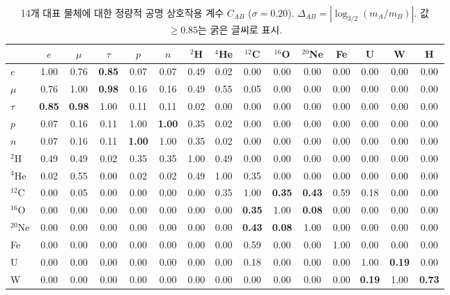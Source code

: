 \documentclass[11pt,a4paper]{article}
\begin{document}
	\begin{table}[H]
		\centering
		\caption{14개 대표 물체에 대한 정량적 공명 상호작용 계수 \(C_{AB}\) (\(\sigma = 0.20\)). \(\Delta_{AB} = |\log_{3/2}(m_A/m_B)|\). 값 \(\ge 0.85\)는 굵은 글씨로 표시.}
		\label{tab:CAB}
		\scriptsize
		\begin{tabular}{l c c c c c c c c c c c c c c}
			\toprule
			& \(e\) & \(\mu\) & \(\tau\) & \(p\) & \(n\) & \(^2\)H & \(^4\)He & \(^{12}\)C & \(^{16}\)O & \(^{20}\)Ne & Fe & U & W & H \\
			\midrule
			\(e\) & 1.00 & 0.76 & \textbf{0.85} & 0.07 & 0.07 & 0.49 & 0.02 & 0.00 & 0.00 & 0.00 & 0.00 & 0.00 & 0.00 & 0.00 \\
			\(\mu\) & 0.76 & 1.00 & \textbf{0.98} & 0.16 & 0.16 & 0.49 & 0.55 & 0.05 & 0.00 & 0.00 & 0.00 & 0.00 & 0.00 & 0.00 \\
			\(\tau\) & \textbf{0.85} & \textbf{0.98} & 1.00 & 0.11 & 0.11 & 0.02 & 0.00 & 0.00 & 0.00 & 0.00 & 0.00 & 0.00 & 0.00 & 0.00 \\
			\(p\) & 0.07 & 0.16 & 0.11 & 1.00 & \textbf{1.00} & 0.35 & 0.02 & 0.00 & 0.00 & 0.00 & 0.00 & 0.00 & 0.00 & 0.00 \\
			\(n\) & 0.07 & 0.16 & 0.11 & \textbf{1.00} & 1.00 & 0.35 & 0.02 & 0.00 & 0.00 & 0.00 & 0.00 & 0.00 & 0.00 & 0.00 \\
			\(^2\)H & 0.49 & 0.49 & 0.02 & 0.35 & 0.35 & 1.00 & 0.49 & 0.00 & 0.00 & 0.00 & 0.00 & 0.00 & 0.00 & 0.00 \\
			\(^4\)He & 0.02 & 0.55 & 0.00 & 0.02 & 0.02 & 0.49 & 1.00 & 0.35 & 0.00 & 0.00 & 0.00 & 0.00 & 0.00 & 0.00 \\
			\(^{12}\)C & 0.00 & 0.05 & 0.00 & 0.00 & 0.00 & 0.00 & 0.35 & 1.00 & \textbf{0.35} & \textbf{0.43} & 0.59 & 0.18 & 0.00 & 0.00 \\
			\(^{16}\)O & 0.00 & 0.00 & 0.00 & 0.00 & 0.00 & 0.00 & 0.00 & \textbf{0.35} & 1.00 & \textbf{0.08} & 0.00 & 0.00 & 0.00 & 0.00 \\
			\(^{20}\)Ne & 0.00 & 0.00 & 0.00 & 0.00 & 0.00 & 0.00 & 0.00 & \textbf{0.43} & \textbf{0.08} & 1.00 & 0.00 & 0.00 & 0.00 & 0.00 \\
			Fe & 0.00 & 0.00 & 0.00 & 0.00 & 0.00 & 0.00 & 0.00 & 0.59 & 0.00 & 0.00 & 1.00 & 0.00 & 0.00 & 0.00 \\
			U & 0.00 & 0.00 & 0.00 & 0.00 & 0.00 & 0.00 & 0.00 & 0.18 & 0.00 & 0.00 & 0.00 & 1.00 & \textbf{0.19} & 0.00 \\
			W & 0.00 & 0.00 & 0.00 & 0.00 & 0.00 & 0.00 & 0.00 & 0.00 & 0.00 & 0.00 & 0.00 & \textbf{0.19} & 1.00 & \textbf{0.73} \\

\end{tabular}
\end{table}
\end{document}

